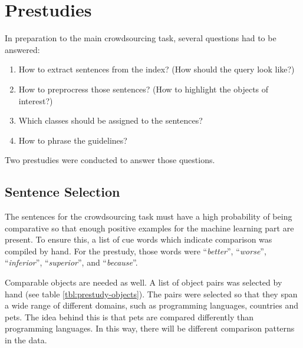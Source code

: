 \section{Prestudies}
In preparation to the main crowdsourcing task, several questions had to be answered:
\begin{enumerate}
\item How to extract sentences from the index? (How should the query look like?)
\item How to preprocress those sentences? (How to highlight the objects of interest?)
\item Which classes should be assigned to the sentences?
\item How to phrase the guidelines?
\end{enumerate}

Two prestudies were conducted to answer those questions.



\subsection{Sentence Selection}
The sentences for the crowdsourcing task must have a high probability of being comparative so that enough positive examples for the machine learning part are present. To ensure this, a list of cue words which indicate comparison was compiled by hand. For the prestudy, those words were \enquote{\emph{better}}, \enquote{\emph{worse}}, \enquote{\emph{inferior}}, \enquote{\emph{superior}}, and \enquote{\emph{because}}. 

Comparable objects are needed as well. A list of object pairs was selected by hand (see table \ref{tbl:prestudy-objects}). The pairs were selected so that they span a wide range of different domains, such as programming languages, countries and pets. The idea behind this is that pets are compared differently than programming languages. In this way, there will be different comparison patterns in the data.

